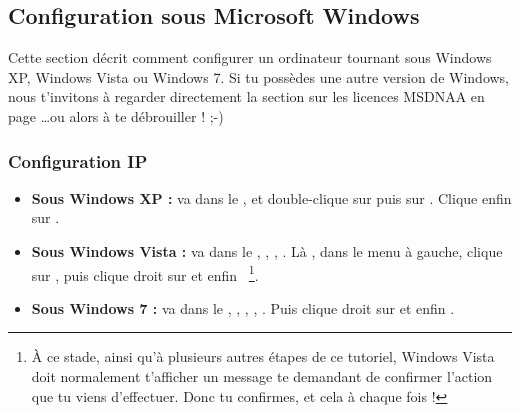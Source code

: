 


\subsection{Configuration sous Microsoft Windows}


Cette section d\'ecrit comment configurer un ordinateur tournant sous Windows XP, Windows Vista ou Windows 7. Si tu poss\`edes une autre version de Windows,
nous t'invitons \`a  regarder directement la section sur les licences MSDNAA en page \pageref{msdnaa}\dots ou alors \`a  te d\'ebrouiller ! ;-)

\subsubsection{Configuration IP}

\begin{itemize}

\item \textbf{Sous Windows XP :} va dans le ,  et double-clique sur  puis sur . Clique enfin sur .

\item \textbf{Sous Windows Vista :} va dans le , , , . L\`a , dans le menu \`a  gauche, clique sur , puis clique droit sur  et enfin  ~\footnote{\`A ce stade, ainsi qu'\`a  plusieurs autres \'etapes de ce tutoriel, Windows Vista doit normalement t'afficher un message te demandant de confirmer l'action que tu viens d'effectuer. Donc tu confirmes, et cela \`a  chaque fois !}.

\item \textbf{Sous Windows 7 :} va dans le , , , , . Puis clique droit sur  et enfin  .

\end{itemize}



